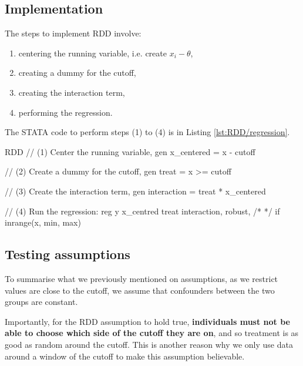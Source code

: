         \subsection{Implementation}
            The steps to implement RDD involve:
            \begin{enumerate}[(1)]
                \item centering the running variable, i.e. create $x_i-\theta$, 
                \item creating a dummy for the cutoff,
                \item creating the interaction term,
                \item performing the regression.
            \end{enumerate}
            The STATA code to perform steps (1) to (4) is in Listing \ref{lst:RDD/regression}.
            \begin{sexylisting}[colback=white, label=lst:RDD/regression]{RDD}
//  (1) Center the running variable,
    gen x_centered = x - cutoff
    
//  (2) Create a dummy for the cutoff,
    gen treat = x >= cutoff
    
//  (3) Create the interaction term,
    gen interaction = treat * x_centered

//  (4) Run the regression:
    reg y x_centred treat interaction, robust, /*
    */  if inrange(x, min, max)
            \end{sexylisting}

        \subsection{Testing assumptions}
            To summarise what we previously mentioned on assumptions, as we restrict values are close to the cutoff, we assume that confounders between the two groups are constant.

            Importantly, for the RDD assumption to hold true, \textbf{individuals must not be able to choose which side of the cutoff they are on}, and so treatment is as good as random around the cutoff. This is another reason why we only use data around a window of the cutoff to make this assumption believable.

